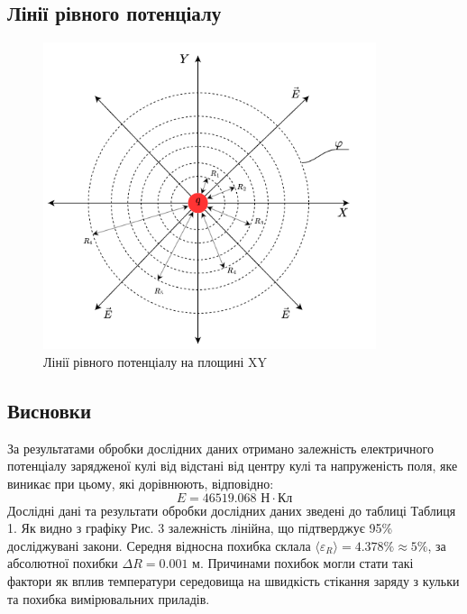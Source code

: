 \documentclass[a4paper,12pt]{article}
\begin{document}
\begin{justify}
\subsection{Лінії рівного потенціалу}
	\begin{figure}[!h]
		\centering
			\includegraphics[height=90mm]{media/graph12.png}
    		\caption{Лінії рівного потенціалу на площині XY}
			\label{fig:8a}
    	\end{figure}	
\subsection{Висновки}
За результатами обробки дослідних даних отримано залежність електричного потенціалу зарядженої кулі від відстані від центру кулі та напруженість поля, яке виникає при цьому, які дорівнюють, відповідно:
$$E=46519.068\textrm{ Н}\cdot\textrm{Кл}$$
Дослідні дані та результати обробки дослідних даних зведені до таблиці Таблиця 1. Як видно з графіку Рис. 3 залежність лінійна, що підтверджує 95\% досліджувані закони. Середня відносна похибка склала $\langle\varepsilon_R\rangle = 4.378\% \approx5\%$, за абсолютної 	похибки $\Delta R=0.001$ м. Причинами похибок 	могли стати такі 	фактори як 	вплив температури середовища на швидкість стікання заряду з кульки та 	похибка вимірювальних приладів.
	
	
	
	
	
	
	
	
	
	
	
	
	
	
	
	
	
	
	
	
	
	
	
	
	
	
	
	
	
	
	
	
	
	
	
	
	
	
	
	
	
	
	
	\end{justify}
\end{document}
